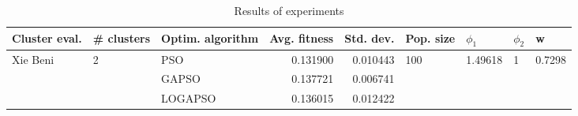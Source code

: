 \begin{table}
\centering
\caption{Results of experiments}
\begin{tabular}{lllrrllll}
\toprule
            Cluster eval. &        \# clusters & Optim. algorithm &  Avg. fitness &  Std. dev. &            Pop. size &               $\phi_{1}$ &         $\phi_{2}$ &                       w \\
\midrule
\multirow{3}{*}{Xie Beni} & \multirow{3}{*}{2} &              PSO &      0.131900 &   0.010443 & \multirow{3}{*}{100} & \multirow{3}{*}{1.49618} & \multirow{3}{*}{1} & \multirow{3}{*}{0.7298} \\
                          &                    &            GAPSO &      0.137721 &   0.006741 &                      &                          &                    &                         \\
                          &                    &          LOGAPSO &      0.136015 &   0.012422 &                      &                          &                    &                         \\
\bottomrule
\end{tabular}
\end{table}
